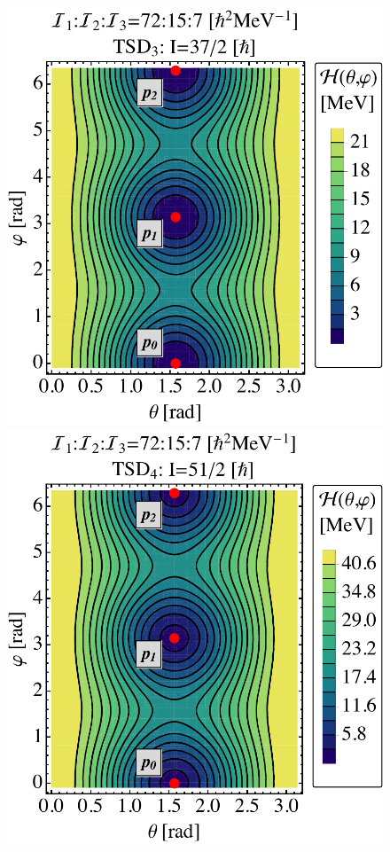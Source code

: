 \documentclass[myclassdoc,debug]{rjparticle}
\begin{document}
\begin{figure}
\centering
\begin{minipage}{.5\textwidth}
  \centering
  \includegraphics[scale=0.45]{figs/contour3_optimal.pdf}
\end{minipage}%
\begin{minipage}{.5\textwidth}
  \centering
 \includegraphics[scale=0.45]{figs/contour4_optimal.pdf}

\end{minipage}
\end{figure}
\end{document}
